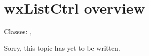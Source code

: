 \section{wxListCtrl overview}\label{wxlistctrloverview}

Classes: , 

Sorry, this topic has yet to be written.

